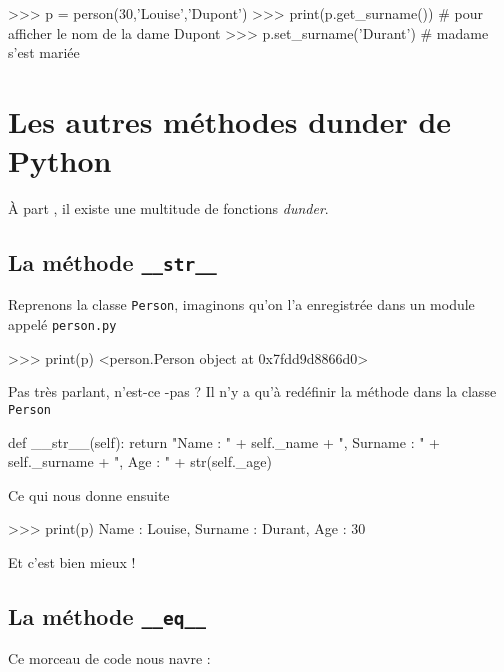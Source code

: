\documentclass[a4paper,12pt,french]{book}
\begin{document}
\begin{pythonshell}
>>> p = person(30,'Louise','Dupont')
>>> print(p.get_surname()) # pour afficher le nom de la dame
Dupont
>>> p.set_surname('Durant') # madame s'est mariée
\end{pythonshell}

\section{Les autres méthodes dunder de Python}

À part , il existe une multitude de fonctions \textit{dunder}.

\subsection{La méthode \texttt{\_\_str\_\_}}
Reprenons la classe \texttt{Person}, imaginons qu'on l'a enregistrée dans un module appelé \texttt{person.py}
\begin{pythonshell}
>>> print(p)
<person.Person object at 0x7fdd9d8866d0>
\end{pythonshell}
Pas très parlant, n'est-ce -pas ? Il n'y a qu'à redéfinir la méthode  dans la classe \texttt{Person}
\begin{pythoncode}
def __str__(self):
 return "Name : " + self._name + ", Surname : " + self._surname + ", Age : " + str(self._age)
\end{pythoncode}
Ce qui nous donne ensuite 
\begin{pythonshell}
>>> print(p)
Name : Louise, Surname : Durant, Age : 30
\end{pythonshell}
Et c'est bien mieux !


\subsection{La méthode \texttt{\_\_eq\_\_}}

Ce morceau de code nous navre :
\end{document}
